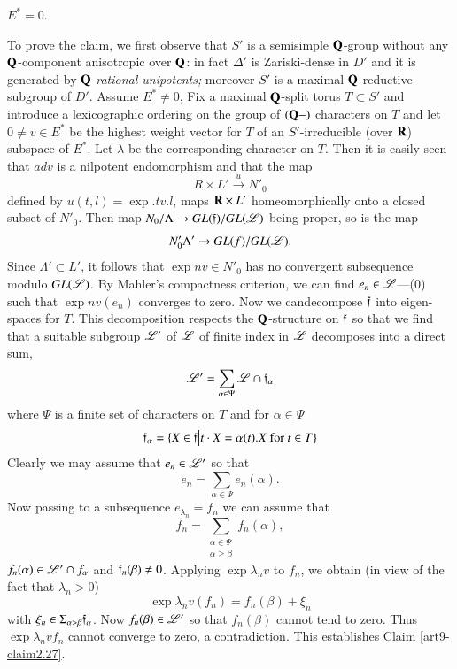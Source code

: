 \setcounter{definition}{26}
\begin{claim}\label{art9-claim2.27}
$E^\ast = 0$.
\end{claim}

To prove the claim, we first observe that $S'$ is a semisimple $\mathbf{Q}$-group without any $\mathbf{Q}$-component anisotropic over $\mathbf{Q}$: in fact $\Delta'$ is Zariski-dense in $D'$ and it is generated by $\mathbf{Q}$-\textit{rational unipotents;} moreover $S'$ is a maximal $\mathbf{Q}$-reductive subgroup of $D'$. Assume  $E^\ast \neq 0$, Fix a maximal $\mathbf{Q}$-split torus $T \subset S'$ and introduce a lexicographic ordering on the group of $(\mathbf{Q}-)$ characters on $T$ and let $0 \neq v \in E^\ast$ be the highest weight vector for $T$ of an $S'$-irreducible (over $\mathbf{R}$) subspace of $E^\ast$. Let $\lambda$ be the corresponding character on $T$. Then it is easily seen that $ad v$ is a nilpotent endomorphism and that the map
$$
R \times L' \xrightarrow{u} N'_0
$$
defined by $u (t, l)=\exp. t v. l$, maps $\mathbf{R}\times L'$ homeomorphically onto a closed subset of $N'_0$. Then map $N_0/\Lambda \to G L (\mathfrak{f})/ GL (\mathscr{L})$ being proper, so is the map
$$
N'_0 \Lambda' \to GL (f) / GL (\mathscr{L}).
$$
Since $\Lambda' \subset L'$, it follows that $\exp n v \in N'_0$ has no convergent subsequence modulo $GL(\mathscr{L})$. By Mahler's compactness criterion, we can find $e_n \in \mathscr{L} $---(0) such that $\exp n v (e_n)$ converges to zero. Now  we can\pageoriginale decompose $\mathfrak{f}$ into eigen-spaces for $T$. This decomposition respects the $\mathbf{Q}$-structure on $\mathfrak{f}$ so that we find that a suitable subgroup $\mathscr{L}'$ of $\mathscr{L}$ of finite index in $\mathscr{L}$ decomposes into a direct sum,
$$
\mathscr{L}' = \sum\limits_{\alpha \in \Psi} \mathscr{L} \cap \mathfrak{f}_\alpha
$$
where $\Psi$ is a finite set of characters on $T$ and for $\alpha \in \Psi$
$$
\mathfrak{f}_\alpha = \{X \in \mathfrak{f} \big| t\cdot X = \alpha (t). X \text{ for } t \in T \}
$$
Clearly we may assume that $e_n \in \mathscr{L}'$ so that 
$$
e_n = \sum\limits_{\alpha \in \Psi} e_n (\alpha).
$$
Now passing to a subsequence $e_{\lambda_n} = f_n$ we can assume that
$$
f_n = \sum\limits_{\substack{\alpha \in \Psi\\ \alpha \geqslant \beta}} f_n (\alpha),
$$
$f_n (\alpha) \in\mathscr{L}' \cap f_\alpha$ and $\mathfrak{f}_n (\beta) \neq 0$. Applying $\exp \lambda_n v$ to $f_n$, we obtain (in view of the fact that $\lambda_n > 0$)
$$
\exp \lambda_n v (f_n) = f_n (\beta) + \xi_n
$$
with $\xi_n \in \Sigma_{\alpha > \beta} \mathfrak{f}_\alpha$. Now $f_n (\beta) \in \mathscr{L}'$ so that $f_n(\beta)$ cannot tend to zero. Thus $\exp \lambda_n vf_n$ cannot converge to zero, a contradiction. This establishes Claim \ref{art9-claim2.27}.

